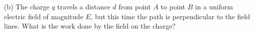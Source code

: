 \vspace{0.3cm}
{\centering {} \par}
\vspace{0.3cm}

(b) The charge $q$ travels a distance $d$ from point $A$ to point $B$ in a
uniform electric field of magnitude $E$, but this time the path is perpendicular
to the field lines. What is the work done by the field on the charge?

\vspace{0.3cm}
{\centering {} \par}
\vspace{0.3cm}

